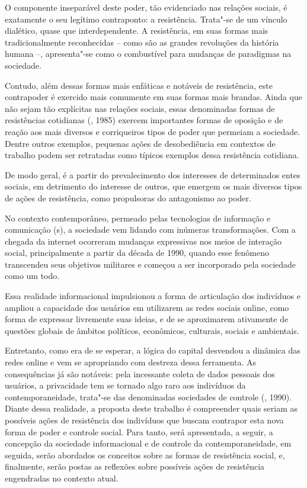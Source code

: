 O componente inseparável deste poder, tão evidenciado nas relações
sociais, é exatamente o seu legítimo contraponto: a resistência.
Trata"-se de um vínculo dialético, quase que interdependente. A
resistência, em suas formas mais tradicionalmente reconhecidas -- como
são as grandes revoluções da história humana --, apresenta"-se como o
combustível para mudanças de paradigmas na sociedade.

Contudo, além dessas formas mais enfáticas e notáveis de resistência,
este contrapoder é exercido mais comumente em suas formas mais brandas.
Ainda que não sejam tão explícitas nas relações sociais, essas
denominadas formas de resistências cotidianas (, 1985) exercem
importantes formas de oposição e de reação aos mais diversos e
corriqueiros tipos de poder que permeiam a sociedade. Dentre outros
exemplos, pequenas ações de desobediência em contextos de trabalho podem
ser retratadas como típicos exemplos dessa resistência cotidiana.

De modo geral, é a partir do prevalecimento dos interesses de
determinados entes sociais, em detrimento do interesse de outros, que
emergem os mais diversos tipos de ações de resistência, como propulsoras
do antagonismo ao poder.

No contexto contemporâneo, permeado pelas tecnologias de informação e
comunicação (s), a sociedade vem lidando com inúmeras transformações.
Com a chegada da internet ocorreram mudanças expressivas nos meios de
interação social, principalmente a partir da década de 1990, quando esse
fenômeno transcendeu seus objetivos militares e começou a ser
incorporado pela sociedade como um todo.

Essa realidade informacional impulsionou a forma de articulação dos
indivíduos e ampliou a capacidade dos usuários em utilizarem as redes
sociais online, como forma de expressar livremente suas ideias, e de se
aproximarem ativamente de questões globais de âmbitos políticos,
econômicos, culturais, sociais e ambientais.

Entretanto, como era de se esperar, a lógica do capital desvendou a
dinâmica das redes online e vem se apropriando com destreza dessa
ferramenta. As consequências já são notáveis: pela incessante coleta de
dados pessoais dos usuários, a privacidade tem se tornado algo raro aos
indivíduos da contemporaneidade, trata"-se das denominadas sociedades de
controle (, 1990). Diante dessa realidade, a proposta deste
trabalho é compreender quais seriam as possíveis ações de resistência
dos indivíduos que buscam contrapor esta nova forma de poder e controle
social. Para tanto, será apresentada, a seguir, a concepção da sociedade
informacional e de controle da contemporaneidade, em seguida, serão
abordados os conceitos sobre as formas de resistência social, e,
finalmente, serão postas as reflexões sobre possíveis ações de
resistência engendradas no contexto atual.

